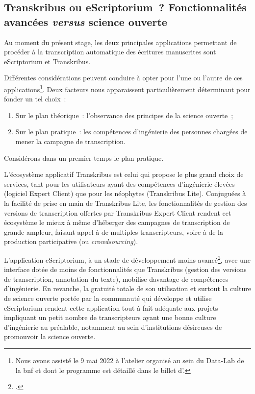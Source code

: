 \documentclass[a4paper,12pt,twoside]{book}
\begin{document}
						\subsection{Transkribus ou eScriptorium~? Fonctionnalités avancées \textit{versus} science ouverte}
			Au moment du présent stage, les deux principales applications permettant de procéder à la transcription automatique des écritures manuscrites sont eScriptorium et Transkribus.
			
			Différentes considérations peuvent conduire à opter pour l'une ou l'autre de ces applications\footnote{Nous avons assisté le 9 mai 2022 à l'atelier organisé au sein du Data-Lab de la \gls{bnf} et dont le programme est détaillé dans le billet d'\cite{jacquotTranskribusEScriptoriumTranscrire}.}. Deux facteurs nous apparaissent particulièrement déterminant pour fonder un tel choix~:
			
			\begin{enumerate}
				\item Sur le plan théorique~: l'observance des principes de la science ouverte~;
				\item Sur le plan pratique~: les compétences d'ingénierie des personnes chargées de mener la campagne de transcription.
			\end{enumerate}
			
			Considérons dans un premier temps le plan pratique.
			
			L'écosystème applicatif Transkribus est celui qui propose le plus grand choix de services, tant pour les utilisateurs ayant des compétences d'ingénierie élevées (logiciel Expert Client) que pour les néophytes (Transkribus Lite). Conjuguées à la facilité de prise en main de Transkribus Lite, les fonctionnalités de gestion des versions de transcription offertes par Transkribus Expert Client rendent cet écosystème le mieux à même d'héberger des campagnes de transcription de grande ampleur, faisant appel à de multiples transcripteurs, voire à de la production participative (ou \textit{crowdsourcing}).
			
			L'application eScriptorium, à un stade de développement moins avancé\footcite{stokesEScriptoriumVREManuscript2021}, avec une interface dotée de moins de fonctionnalités que Transkribus (gestion des versions de transcription, annotation du texte), mobilise davantage de compétences d'ingénierie. En revanche, la gratuité totale de son utilisation et surtout la culture de science ouverte portée par la communauté qui développe et utilise eScriptorium rendent cette application tout à fait adéquate aux projets impliquant un petit nombre de transcripteurs ayant une bonne culture d'ingénierie au préalable, notamment au sein d'institutions désireuses de promouvoir la science ouverte.
			
\end{document}
